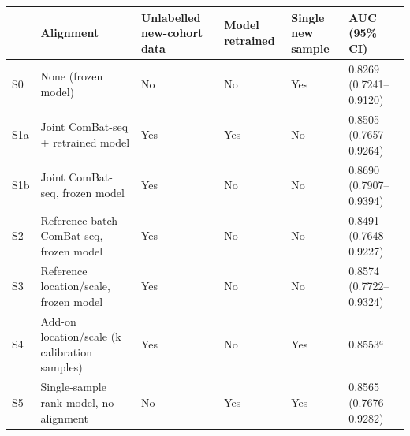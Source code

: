 \footnotesize
\begin{tabular}{llllll}
\toprule
 & Alignment & Unlabelled new-cohort data & Model retrained & Single new sample & AUC (95\% CI) \\
\midrule
S0 & None (frozen model) & No & No & Yes & 0.8269 (0.7241--0.9120) \\
S1a & Joint ComBat-seq + retrained model & Yes & Yes & No & 0.8505 (0.7657--0.9264) \\
S1b & Joint ComBat-seq, frozen model & Yes & No & No & 0.8690 (0.7907--0.9394) \\
S2 & Reference-batch ComBat-seq, frozen model & Yes & No & No & 0.8491 (0.7648--0.9227) \\
S3 & Reference location/scale, frozen model & Yes & No & No & 0.8574 (0.7722--0.9324) \\
S4 & Add-on location/scale (k calibration samples) & Yes & No & Yes & 0.8553$^{a}$ \\
S5 & Single-sample rank model, no alignment & No & Yes & Yes & 0.8565 (0.7676--0.9282) \\
\bottomrule
\end{tabular}
